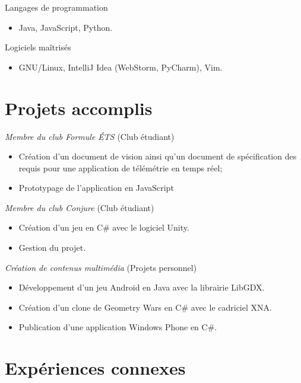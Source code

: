 \documentclass{res}
\begin{document}
\begin{resume}
Langages de programmation
\begin{itemize}
	\item Java, JavaScript, Python.
\end{itemize}

Logiciels maîtrisés
\begin{itemize}
	\item GNU/Linux, IntelliJ Idea (WebStorm, PyCharm), Vim.
\end{itemize}

\newpage

\section{Projets accomplis}
\vspace{8pt}

{\sl Membre du club Formule ÉTS} \hfill (Club étudiant)
\begin{itemize} \itemsep -2pt
	\item Création d’un document de vision ainsi qu’un document de spécification des requis pour une application de télémétrie en temps réel;
	\item Prototypage de l’application en JavaScript
\end{itemize}

{\sl Membre du club Conjure} \hfill (Club étudiant)
\begin{itemize} \itemsep -2pt
	\item Création d’un jeu en C\# avec le logiciel Unity.
	\item Gestion du projet.
\end{itemize}

{\sl Création de contenus multimédia} \hfill (Projets personnel)
\begin{itemize} \itemsep -2pt
	\item Développement d’un jeu Android en Java avec la librairie LibGDX.
	\item Création d’un clone de Geometry Wars en C\# avec le cadriciel XNA.
	\item Publication d’une application Windows Phone en C\#.
\end{itemize}

\vspace{0.1in}


\section{Expériences connexes}
\vspace{12pt}


\end{resume}
\end{document}
